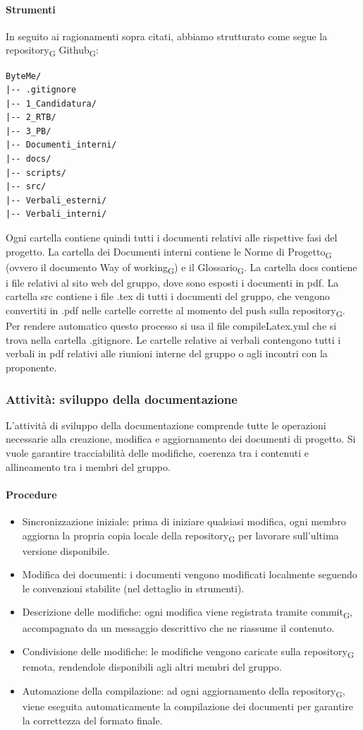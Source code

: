 \documentclass[11pt,a4paper]{article}
\newcommand{\gls}[1]{#1\textsubscript{G}}
\begin{document}
\paragraph{Strumenti}
In seguito ai ragionamenti sopra citati, abbiamo strutturato come segue la \gls{repository} \gls{Github}:
\begin{verbatim}
ByteMe/
|-- .gitignore
|-- 1_Candidatura/
|-- 2_RTB/
|-- 3_PB/
|-- Documenti_interni/
|-- docs/
|-- scripts/
|-- src/
|-- Verbali_esterni/
|-- Verbali_interni/
\end{verbatim}

Ogni cartella contiene quindi tutti i documenti relativi alle rispettive fasi del progetto.
La cartella dei Documenti interni contiene le \gls{Norme di Progetto} (ovvero il documento \gls{Way of working}) e il \gls{Glossario}.
La cartella docs contiene i file relativi al sito web del gruppo, dove sono esposti i documenti in pdf.
La cartella src contiene i file .tex di tutti i documenti del gruppo, che vengono convertiti in .pdf nelle cartelle corrette al momento del push sulla \gls{repository}. Per rendere automatico questo processo si usa il file compileLatex.yml che si trova nella cartella .gitignore.
Le cartelle relative ai verbali contengono tutti i verbali in pdf relativi alle riunioni interne del gruppo o agli incontri con la proponente.

\subsubsection{Attività: sviluppo della documentazione}
L’attività di sviluppo della documentazione comprende tutte le operazioni necessarie alla creazione, modifica e aggiornamento dei documenti di progetto.
Si vuole garantire tracciabilità delle modifiche, coerenza tra i contenuti e allineamento tra i membri del gruppo.

\paragraph{Procedure}
\begin{itemize}
\item Sincronizzazione iniziale: prima di iniziare qualsiasi modifica, ogni membro aggiorna la propria copia locale della \gls{repository} per lavorare sull’ultima versione disponibile.
\item Modifica dei documenti: i documenti vengono modificati localmente seguendo le convenzioni stabilite (nel dettaglio in strumenti).
\item Descrizione delle modifiche: ogni modifica viene registrata tramite \gls{commit}, accompagnato da un messaggio descrittivo che ne riassume il contenuto.
\item Condivisione delle modifiche: le modifiche vengono caricate sulla \gls{repository} remota, rendendole disponibili agli altri membri del gruppo.

\item Automazione della compilazione: ad ogni aggiornamento della \gls{repository}, viene eseguita automaticamente la compilazione dei documenti per garantire la correttezza del formato finale.
\end{itemize}
\end{document}
